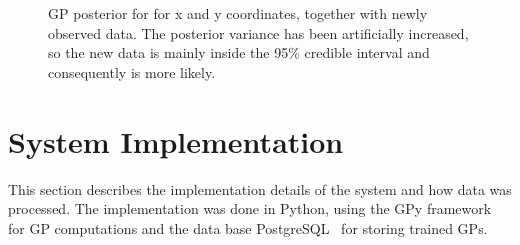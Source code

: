 \begin{figure}[H]
\begin{minipage}{.46\textwidth}
    \caption{GP posterior for for x and y coordinates, together with newly
      observed data. The posterior variance has been artificially increased, so the
      new data is mainly inside the 95\% credible interval and
      consequently is more likely.}\label{fig:ok-variance}
  \end{minipage}
\end{figure}

\section{System Implementation}
This section describes the implementation details of the system and
how data was processed. The implementation was done in Python, using the GPy
framework~\cite{gpy2014} for GP computations and the data base
PostgreSQL~\cite{BibEntry2019Feb} for storing trained GPs.


